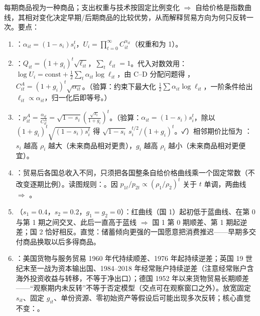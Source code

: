 \begin{intubox}
每期商品视为一种商品；支出权重与技术按固定比例变化 $\Rightarrow$ 自给价格是指数曲线，其相对变化决定早期/后期商品的比较优势，从而解释贸易方向为何只反转一次。要点：
\begin{enumerate}
  \item {}：$\alpha_{it} = (1 - s_i) s_i^t$，$U_i = \prod_{t=0}^{\infty} C_{it}^{\alpha_{it}}$（权重和为 1）。
  \item {}：$Q_{it} = (1 + g_i)^t \sqrt{\ell_{it}}$，$\sum_t \ell_{it} = 1$。代入对数效用：$\log U_i = \text{const} + \frac{1}{2} \sum_t \alpha_{it} \log \ell_{it}$，由 C--D 分配问题得 ，$C_{it}^A = (1 + g_i)^t \sqrt{\alpha_{it}}$。（验算：约束下最大化 $\frac12\sum \alpha_{it}\log \ell_{it}$，一阶条件给出 $\ell_{it} \propto \alpha_{it}$，归一化后即等号。）
  \item {}：$p_{it}^A = \frac{\alpha_{it}}{C_{it}^A} = \sqrt{1 - s_i}\left( \frac{\sqrt{s_i}}{1 + g_i} \right)^t$。（验算：$\alpha_{it} = (1-s_i)s_i^t$，除以 $(1+g_i)^t \sqrt{(1-s_i)s_i^t}$ 得 $\sqrt{1-s_i}\, s_i^{t/2} / (1+g_i)^t$。✓）相邻期价比恒为 ：$s_i$ 越高 $\rho_i$ 越大（未来商品相对更贵），$g_i$ 越高 $\rho_i$ 越小（未来商品相对更便宜）。
  \item {}：贸易后各国总收入不同，只须把各国整条自给价格曲线乘一个固定常数（不改变逐期比例）。读图规则：。因 $p_{1t}/p_{2t} \propto (\rho_1/\rho_2)^t$ 关于 $t$ 单调，两曲线 $\Rightarrow$ 。
  \item {}（$s_1 = 0.4$，$s_2 = 0.2$，$g_1 = g_2 = 0$）：红曲线（国 1）起初低于蓝曲线、在第 0 与第 1 期之间交叉、此后一直高于蓝线 $\Rightarrow$ 国 1 第 0 期顺差、第 1 期起逆差；国 2 恰好相反。直觉：储蓄倾向更强的一国愿意把消费推迟——早期多交付商品换取以后多得商品。
  \item {}：美国货物与服务贸易 1960 年代持续顺差、1976 年起持续逆差；英国 19 世纪末至一战为资本输出国、1984--2018 年经常账户持续逆差（注意经常账户含海外投资收益与转移，不等于净出口）；德国 1952 年以来货物贸易长期顺差——``观察期内未反转''不等于否定模型（交点可在观察窗口之外）。放宽固定 $s_{it}$、固定 $g_{it}$、单份资源、零初始资产等假设后可能出现多次反转；核心直觉不变：。
\end{enumerate}
\end{intubox}

